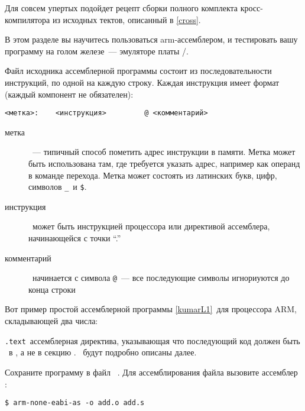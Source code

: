 Для совсем упертых подойдет рецепт сборки полного комплекта кросс-компилятора из
исходных тектов, описанный в \ref{cross}.

\secup
{}\secdown

В этом разделе вы научитесь пользоваться arm-ассемблером, и тестировать вашу
программу на голом железе\ --- эмуляторе платы /\qemu.

Файл исходника ассемблерной программы состоит из последовательности инструкций,
по одной на каждую строку. Каждая инструкция имеет формат (каждый
компонент не обязателен):

\begin{verbatim}
<метка>:    <инструкция>         @ <комментарий>
\end{verbatim}

\begin{description}
\item[метка]\ --- типичный способ пометить адрес инструкции в памяти. Метка
может быть использована там, где требуется указать адрес, например как операнд
в команде перехода. Метка может состоять из латинских букв, цифр, символов \verb|_|\ и \verb|$|.
\item[инструкция]\ может быть инструкцией процессора или директивой ассемблера,
начинающейся с точки ``.''
\item[комментарий]\ начинается с символа \verb|@|\ --- все последующие символы
игнориуются до конца строки
\end{description}

Вот пример простой ассемблерной программы \ref{kumarL1}\ для процессора ARM,
складывающей два числа:

\label{kumarL1}

\verb|.text|\ ассемблерная директива, указывающая что последующий код должен
быть \ в , а не в секцию
. \ будут подробно описаны далее.


Сохраните программу в файл \ .
Для ассемблирования файла вызовите ассемблер :

\begin{verbatim}
$ arm-none-eabi-as -o add.o add.s
\end{verbatim}

